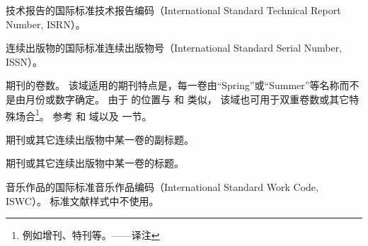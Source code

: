 \begin{fieldlist}


技术报告的国际标准技术报告编码（International Standard Technical Report Number,  ISRN）。




连续出版物的国际标准连续出版物号（International Standard Serial Number,  ISSN）。




期刊的卷数。
该域适用的期刊特点是，每一卷由“Spring”或“Summer”等名称而不是由月份或数字确定。
由于  的位置与  和  类似，
该域也可用于双重卷数或其它特殊场合\footnote{
	例如增刊、特刊等。——译注}。
参考  和  域以及  一节。




期刊或其它连续出版物中某一卷的副标题。




期刊或其它连续出版物中某一卷的标题。




音乐作品的国际标准音乐作品编码（International Standard Work Code,  ISWC）。
标准文献样式中不使用。


\end{fieldlist}
